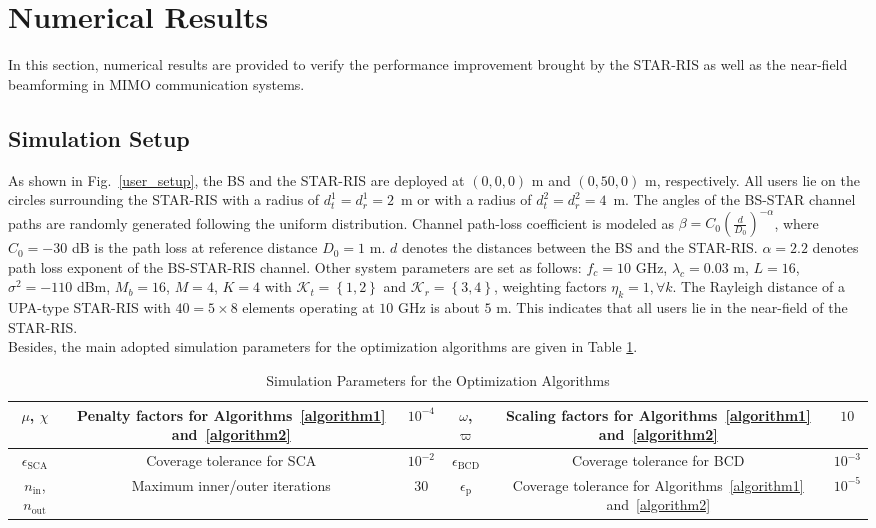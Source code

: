 \documentclass[12pt, draftclsnofoot, onecolumn]{IEEEtran}
\begin{document}
\section{Numerical Results}
In this section, numerical results are provided to verify the performance improvement brought by the STAR-RIS as well as the near-field beamforming in MIMO communication systems.
\subsection{Simulation Setup}
As shown in Fig.~\ref{user_setup}, the BS and the STAR-RIS are deployed at $\left({0, 0, 0}\right)$ m and $\left({0, 50, 0}\right)$ m, respectively. All users lie on the circles surrounding the STAR-RIS with a radius of $d_t^1=d_r^1=2$~m or with a radius of $d_t^2=d_r^2=4$~m. The angles of the BS-STAR channel paths are randomly generated following the uniform distribution. Channel path-loss coefficient is modeled as $\beta=C_{0}\left(\frac{d}{D_{0}}\right)^{-\alpha}$, where $C_{0}=-30$ dB is the path loss at reference distance $D_{0}=1$ m. $d$ denotes the distances between the BS and the STAR-RIS. $\alpha=2.2$ denotes path loss exponent of the BS-STAR-RIS channel. Other system parameters are set as follows: $f_c=10$ GHz, $\lambda_c=0.03$ m, $L=16$, $\sigma^{2}=-110$ dBm, $M_b=16$, $M=4$, $K=4$ with $\mathcal{K}_t=\left\{1,2\right\}$ and $\mathcal{K}_r=\left\{3,4\right\}$, weighting factors $ \eta_k=1, \forall k$. The Rayleigh distance of a UPA-type STAR-RIS with $40=5\times 8$ elements operating at $10$ GHz is about $5$ m. This indicates that all users lie in the near-field of the STAR-RIS.\\
\indent Besides, the main adopted simulation parameters for the optimization algorithms are given in Table \ref{simulation_parameters}.
\begingroup
\renewcommand{\arraystretch}{1} %
\begin{table}[h]
\centering
\begin{footnotesize}
\caption{Simulation Parameters for the Optimization Algorithms}
\label{simulation_parameters}
\centering
\begin{tabular}{|c|c|c||c|c|c|}
\hline
$\mu$, $\chi$&  Penalty factors for Algorithms~\ref{algorithm1} and~\ref{algorithm2}& $10^{-4}$&  $\omega$, $\varpi$& Scaling factors for Algorithms~\ref{algorithm1} and~\ref{algorithm2}& $10$ \\
\hline
$\epsilon_{\text{SCA}}$&  Coverage tolerance for SCA& $10^{-2}$&  $\epsilon_{\text{BCD}}$ & Coverage tolerance for BCD& $10^{-3}$ \\
\hline
$n_\text{in}$, $n_\text{out}$&  Maximum inner/outer iterations& $30$&  $\epsilon_{\text{p}}$& Coverage tolerance for Algorithms~\ref{algorithm1} and~\ref{algorithm2}& $10^{-5}$ \\
\hline
\end{tabular}
\end{footnotesize}
\end{table}
\end{document}
